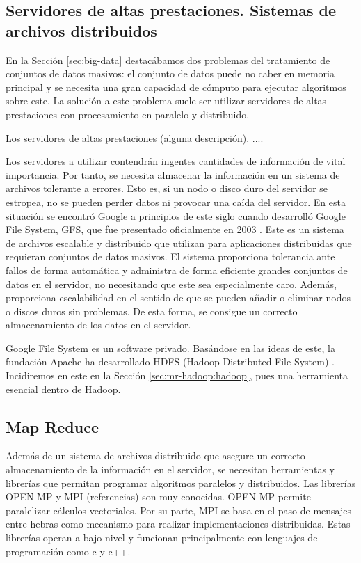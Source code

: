 \documentclass[10pt]{article}
\begin{document}
	\subsection{Servidores de altas prestaciones. Sistemas de archivos distribuidos} \label{sec:mr-hadoop:servidores}

		En la Sección \ref{sec:big-data} destacábamos dos problemas del tratamiento de conjuntos de datos masivos: el conjunto de datos puede no caber en memoria principal y se necesita una gran capacidad de cómputo para ejecutar algoritmos sobre este. La solución a este problema suele ser utilizar servidores de altas prestaciones con procesamiento en paralelo y distribuido.
	
		Los servidores de altas prestaciones (alguna descripción). .... 
		
		Los servidores a utilizar contendrán ingentes cantidades de información de vital importancia. Por tanto, se necesita almacenar la información en un sistema de archivos tolerante a errores. Esto es, si un nodo o disco duro del servidor se estropea, no se pueden perder datos ni provocar una caída del servidor. En esta situación se encontró Google a principios de este siglo cuando desarrolló Google File System, GFS, que fue presentado oficialmente en 2003 \cite{gfs}. Este es un sistema de archivos escalable y distribuido que utilizan para aplicaciones distribuidas que requieran conjuntos de datos masivos. El sistema proporciona tolerancia ante fallos de forma automática y administra de forma eficiente grandes conjuntos de datos en el servidor, no necesitando que este sea especialmente caro. Además, proporciona escalabilidad en el sentido de que se pueden añadir o eliminar nodos o discos duros sin problemas. De esta forma, se consigue un correcto almacenamiento de los datos en el servidor.
		
		Google File System es un software privado. Basándose en las ideas de este, la fundación Apache ha desarrollado HDFS (Hadoop Distributed File System) \cite{hdfs}. Incidiremos en este en la Sección \ref{sec:mr-hadoop:hadoop}, pues una herramienta esencial dentro de Hadoop.

	\subsection{Map Reduce} \label{sec:mr-hadoop:map-reduce}

		Además de un sistema de archivos distribuido que asegure un correcto almacenamiento de la información en el servidor, se necesitan herramientas y librerías que permitan programar algoritmos paralelos y distribuidos. Las librerías OPEN MP y MPI (referencias) son muy conocidas. OPEN MP permite paralelizar cálculos vectoriales. Por su parte, MPI se basa en el paso de mensajes entre hebras como mecanismo para realizar implementaciones distribuidas. Estas librerías operan a bajo nivel y funcionan principalmente con lenguajes de programación como c y c++. 
		
\end{document}
